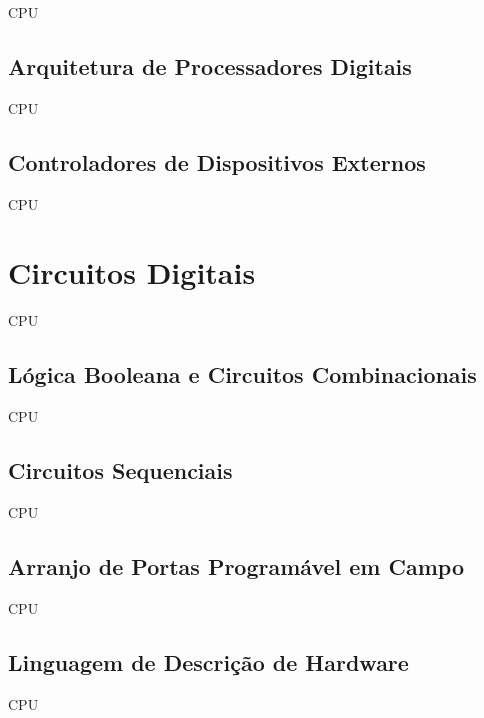 CPU

\subsection{Arquitetura de Processadores Digitais}

CPU

\subsection{Controladores de Dispositivos Externos}

CPU

\section{Circuitos Digitais}

CPU

\subsection{Lógica Booleana e Circuitos Combinacionais}

CPU

\subsection{Circuitos Sequenciais}

CPU

\subsection{Arranjo de Portas Programável em Campo}

CPU

\subsection{Linguagem de Descrição de Hardware}

CPU
